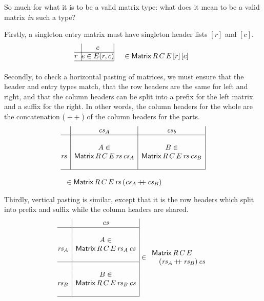 \documentclass{IMEKO2024}
\newcommand{\append}{\mathop{+\!\!+}}
\newcommand{\Matrix}[5]{\mathsf{Matrix}\,#1\,#2\,#3\,#4\,#5}
\newcommand{\remph}{\emph}
\begin{document}
So much for what it is to be a valid matrix type: what does it mean to be a valid matrix \remph{in} such a type?

Firstly, a singleton entry matrix must have singleton header lists $[r]$ and $[c]$.
\[\begin{array}[b]{@{}r|@{}c@{}|l}
\; & c \\
\cline{1-2}
r  & e\in E(r,c) & \quad \in \Matrix{R}{C}{E}{[r]}{[c]} \\
\cline{1-2}
\end{array}
\]

Secondly, to check a horizontal pasting of matrices, we must ensure that the header and entry types match, that the row headers are the same for left and right, and that the column headers can be split into a prefix for the left matrix and a suffix for the right. In other words, the column headers for the whole are the concatenation ($\append$) of the column headers for the parts.
\[\begin{array}{l}
\begin{array}{@{}r|c|c|}
  & \cs_A & \cs_b \\
\hline
&&\\
&A \in & B \in \\
\rs &\Matrix{R}{C}{E}{\rs}{\cs_A} & \Matrix{R}{C}{E}{\rs}{\cs_B} \\
&&\\
\hline
\end{array}\bigskip\\
\;\;\; \in \Matrix{R}{C}{E}{\rs}{(\cs_A\append\cs_B)}
\end{array}\]

Thirdly, vertical pasting is similar, except that it is the row headers which split into prefix and suffix while the column headers are shared.
\[
\begin{array}[c]{@{}r|c|}
  & \cs \\
  \hline
  \;    & \\
  \;    & A \in \\
  \rs_A & \Matrix{R}{C}{E}{\rs_A}{\cs} \\
  \;    & \\
  \hline
  \;    & \\
  \;    & B \in \\
  \rs_B & \Matrix{R}{C}{E}{\rs_B}{\cs} \\
  \;    & \\
  \hline
\end{array}
\in
\begin{array}{l}
\Matrix{R}{C}{E}{\\ \quad (\rs_A\append\rs_B)}{\cs}
\end{array}
\]
\end{document}
